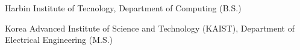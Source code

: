 \documentclass[master,english,final]{kaist-ucs}
\begin{document}
    \begin{personaldata}
    \end{personaldata}

    \begin{education}
        \item[2020. 8.\ --\ 2024. 6.] Harbin Institute of Tecnology, Department of Computing (B.S.)
        \item[2024. 8.\ --\ 2027. 2.] Korea Advanced Institute of Science and Technology (KAIST), Department of Electrical Engineering (M.S.)
    \end{education}


\end{document}

